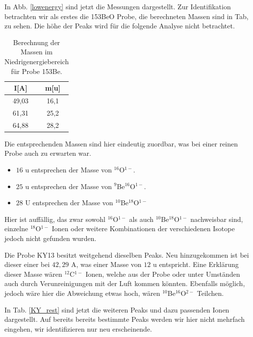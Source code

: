 In Abb. \ref{lowenergy} sind jetzt die Messungen dargestellt.
Zur Identifikation betrachten wir als erstes die 153BeO Probe, die berechneten Massen sind in Tab,  zu sehen.
Die höhe der Peaks wird für die folgende Analyse nicht betrachtet.
\begin{table}[h]
\centering
\caption{Berechnung der Massen im Niedrigenergiebereich für Probe 153Be.}
\begin{tabular}{|c |c|}
\hline
I[A] & m[u] \\
\hline
49,03 & 16,1 \\
61,31 & 25,2 \\
64,88 & 28,2 \\
\hline
\end{tabular}
\label{153Be}
\end{table}
Die entsprechenden Massen sind hier eindeutig zuordbar, was bei einer reinen Probe auch zu erwarten war.
\begin{itemize}
\item $16$ u entsprechen der Masse von $^{16}$O$^{1-}$.
\item $25$ u entsprechen der Masse von $^{9}$Be$^{16}$O$^{1-}$.
\item $28$ U entsprechen der Masse von $^{10}$Be$^{18}$O$^{1-}$
\end{itemize}
Hier ist auffällig, das zwar sowohl $^{16}$O$^{1-}$ als auch  $^{10}$Be$^{18}$O$^{1-}$ nachweisbar sind, einzelne  $^{18}$O$^{1-}$ Ionen oder  weitere Kombinationen der verschiedenen Isotope jedoch nicht gefunden wurden.

Die Probe KY13 besitzt weitgehend dieselben Peaks.
Neu hinzugekommen ist bei dieser einer bei $42,29$ A, was einer Masse von $12$ u entspricht.
Eine Erklärung dieser Masse wären $^{12}$C$^{1-}$ Ionen, welche aus der Probe  oder unter Umständen auch durch Verunreinigungen mit der Luft kommen könnten.
Ebenfalls möglich, jedoch wäre hier die Abweichung etwas hoch, wären $^{10}$Be$^{16}$O$^{2-}$ Teilchen.

In Tab. \ref{KY_rest} sind jetzt die weiteren Peaks und dazu passenden Ionen dargestellt.
Auf bereits bereits bestimmte Peaks werden wir hier nicht mehrfach eingehen, wir identifizieren nur neu erscheinende.

